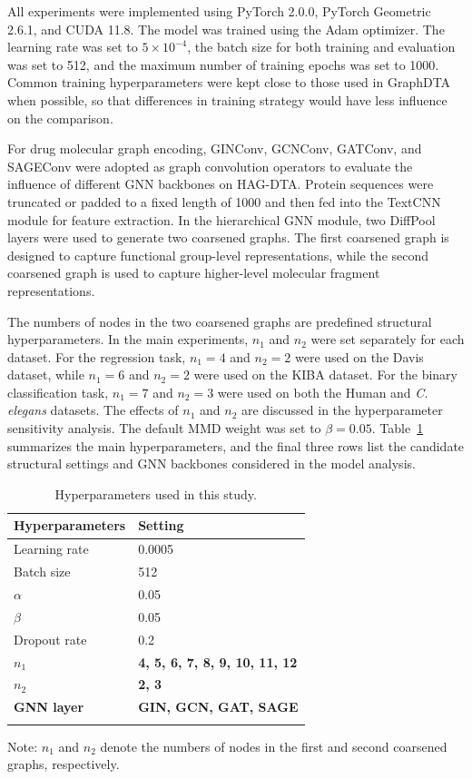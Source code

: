 \documentclass[pdflatex,sn-mathphys-num]{sn-jnl}%
\theoremstyle{thmstyleone}%
\theoremstyle{thmstyletwo}%
\theoremstyle{thmstylethree}%
\begin{document}
All experiments were implemented using PyTorch 2.0.0, PyTorch Geometric 2.6.1, and CUDA 11.8. The model was trained using the Adam optimizer. The learning rate was set to $5\times10^{-4}$, the batch size for both training and evaluation was set to 512, and the maximum number of training epochs was set to 1000. Common training hyperparameters were kept close to those used in GraphDTA~\cite{nguyen2021graphdta} when possible, so that differences in training strategy would have less influence on the comparison.

For drug molecular graph encoding, GINConv, GCNConv, GATConv, and SAGEConv were adopted as graph convolution operators to evaluate the influence of different GNN backbones on HAG-DTA. Protein sequences were truncated or padded to a fixed length of 1000 and then fed into the TextCNN module for feature extraction. In the hierarchical GNN module, two DiffPool layers were used to generate two coarsened graphs. The first coarsened graph is designed to capture functional group-level representations, while the second coarsened graph is used to capture higher-level molecular fragment representations.

The numbers of nodes in the two coarsened graphs are predefined structural hyperparameters. In the main experiments, $n_1$ and $n_2$ were set separately for each dataset. For the regression task, $n_1=4$ and $n_2=2$ were used on the Davis dataset, while $n_1=6$ and $n_2=2$ were used on the KIBA dataset. For the binary classification task, $n_1=7$ and $n_2=3$ were used on both the Human and \textit{C. elegans} datasets. The effects of $n_1$ and $n_2$ are discussed in the hyperparameter sensitivity analysis. The default MMD weight was set to $\beta=0.05$. Table~\ref{table2} summarizes the main hyperparameters, and the final three rows list the candidate structural settings and GNN backbones considered in the model analysis.

\begin{table}[!t]
\caption{Hyperparameters used in this study.\label{table2}}%
\begin{tabular*}{\columnwidth}{@{\extracolsep\fill}ll@{\extracolsep\fill}}
\toprule
Hyperparameters & Setting\\
\midrule
Learning rate & 0.0005\\
Batch size & 512\\
$\alpha$ & 0.05\\
$\beta$ & 0.05\\
Dropout rate & 0.2\\
\textbf{$n_1$} & \textbf{4, 5, 6, 7, 8, 9, 10, 11, 12}\\
\textbf{$n_2$} & \textbf{2, 3}\\
\textbf{GNN layer} & \textbf{GIN, GCN, GAT, SAGE}\\
\botrule
\end{tabular*}
\begin{tablenotes}%
\item Note: $n_1$ and $n_2$ denote the numbers of nodes in the first and second coarsened graphs, respectively.
\end{tablenotes}
\end{table}
\end{document}
